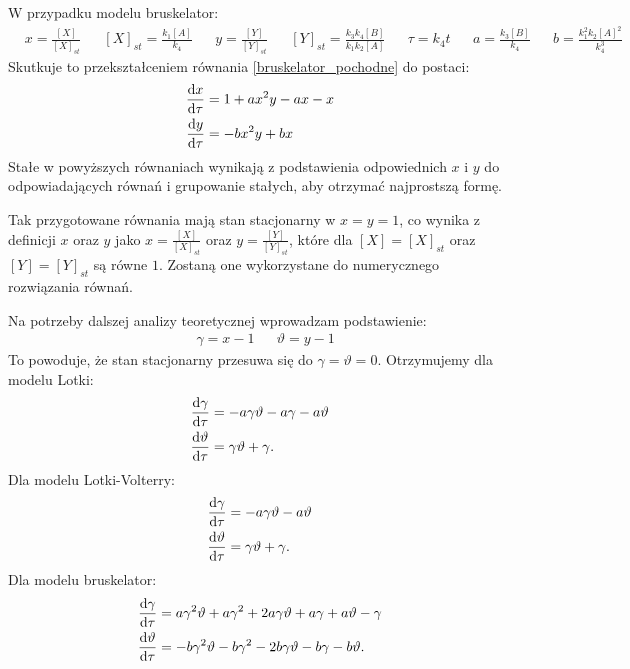 \documentclass[10pt, a4paper, twoside, onecolumn]{article}
\numberwithin{equation}{section}
\begin{document}
	W przypadku modelu bruskelator:
	\begin{align*}
		& x=\frac{[X]}{[X]_{st}} && [X]_{st} = \frac{k_{1}[A]}{k_{4}} && y=\frac{[Y]}{[Y]_{st}} && [Y]_{st} = \frac{k_{3}k_{4}[B]}{k_{1}k_{2}[A]} && \tau=k_{4}t && a=\frac{k_{3}[B]}{k_{4}} && b=\frac{k_{1}^{2}k_{2}[A]^{2}}{k_{4}^{3}}
	\end{align*}
	Skutkuje to przekształceniem równania \eqref{bruskelator_pochodne} do postaci: 
	\begin{equation}\label{bruskelator_prosty}
	\begin{split}
		\dv{x}{\tau} &= 1+ax^{2}y-ax-x \\
		\dv{y}{\tau} &= -bx^{2}y+bx
	\end{split}
	\end{equation}
	Stałe w powyższych równaniach wynikają z podstawienia odpowiednich \(x\) i \(y\) do odpowiadających równań i grupowanie stałych, aby otrzymać najprostszą formę. \par
	Tak przygotowane równania mają stan stacjonarny w \(x=y=1\), co wynika z definicji \(x\) oraz \(y\) jako \(x=\frac{[X]}{[X]_{st}}\) oraz \(y=\frac{[Y]}{[Y]_{st}}\), które dla \([X]=[X]_{st}\) oraz \([Y]=[Y]_{st}\) są równe \(1\). Zostaną one wykorzystane do numerycznego rozwiązania równań. \par
	Na potrzeby dalszej analizy teoretycznej wprowadzam podstawienie:
	\begin{align*}
		& \gamma=x-1 && \vartheta=y-1
	\end{align*}
	To powoduje, że stan stacjonarny przesuwa się do \(\gamma=\vartheta=0\). Otrzymujemy dla modelu Lotki:
	\begin{equation}\label{lotka_0}
	\begin{split}
		\dv{\gamma}{\tau} &= -a\gamma\vartheta-a\gamma-a\vartheta \\
		\dv{\vartheta}{\tau} &= \gamma\vartheta+\gamma.
	\end{split}
	\end{equation}
	Dla modelu Lotki-Volterry:
	\begin{equation}\label{lotka_volterra_0}
	\begin{split}
		\dv{\gamma}{\tau} &= -a\gamma\vartheta-a\vartheta \\
		\dv{\vartheta}{\tau} &= \gamma\vartheta+\gamma.
	\end{split}
	\end{equation}
	Dla modelu bruskelator:
	\begin{equation}\label{bruskelator_0}
	\begin{split}
		\dv{\gamma}{\tau} &= a\gamma^{2}\vartheta+a\gamma^{2}+2a\gamma\vartheta+a\gamma+a\vartheta-\gamma \\
		\dv{\vartheta}{\tau} &= -b\gamma^{2}\vartheta-b\gamma^{2}-2b\gamma\vartheta-b\gamma-b\vartheta.
	\end{split}
	\end{equation}
\end{document}
